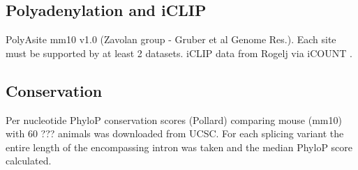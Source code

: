 \subsection{Polyadenylation and iCLIP}
PolyAsite mm10 v1.0 (Zavolan group - Gruber et al Genome Res.). Each site must be supported by at least 2 datasets.
iCLIP data from Rogelj via iCOUNT .

\subsection{Conservation}
Per nucleotide PhyloP conservation scores (Pollard) comparing mouse (mm10) with 60 ??? animals was downloaded from UCSC. For each splicing variant the entire length of the encompassing intron was taken and the median PhyloP score calculated.

\clearpage



